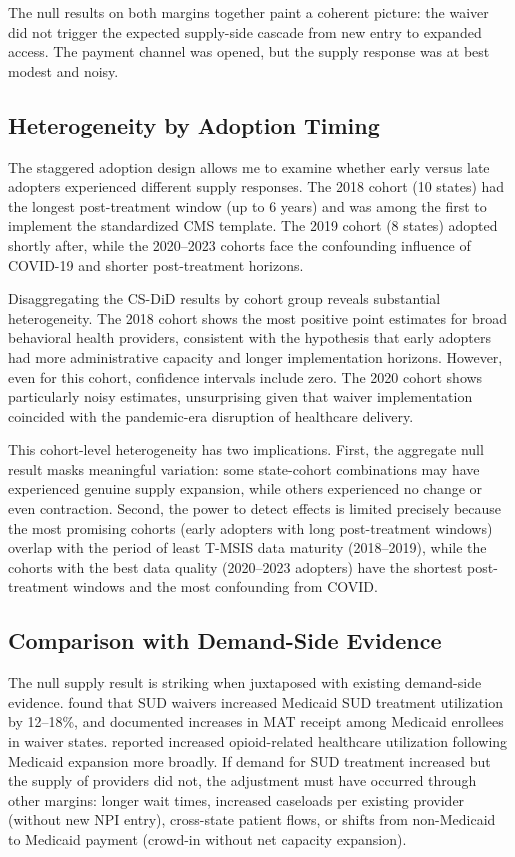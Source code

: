 \documentclass[12pt]{article}
\begin{document}
The null results on both margins together paint a coherent picture: the waiver did not trigger the expected supply-side cascade from new entry to expanded access. The payment channel was opened, but the supply response was at best modest and noisy.

\subsection{Heterogeneity by Adoption Timing}

The staggered adoption design allows me to examine whether early versus late adopters experienced different supply responses. The 2018 cohort (10 states) had the longest post-treatment window (up to 6 years) and was among the first to implement the standardized CMS template. The 2019 cohort (8 states) adopted shortly after, while the 2020--2023 cohorts face the confounding influence of COVID-19 and shorter post-treatment horizons.

Disaggregating the CS-DiD results by cohort group reveals substantial heterogeneity. The 2018 cohort shows the most positive point estimates for broad behavioral health providers, consistent with the hypothesis that early adopters had more administrative capacity and longer implementation horizons. However, even for this cohort, confidence intervals include zero. The 2020 cohort shows particularly noisy estimates, unsurprising given that waiver implementation coincided with the pandemic-era disruption of healthcare delivery.

This cohort-level heterogeneity has two implications. First, the aggregate null result masks meaningful variation: some state-cohort combinations may have experienced genuine supply expansion, while others experienced no change or even contraction. Second, the power to detect effects is limited precisely because the most promising cohorts (early adopters with long post-treatment windows) overlap with the period of least T-MSIS data maturity (2018--2019), while the cohorts with the best data quality (2020--2023 adopters) have the shortest post-treatment windows and the most confounding from COVID.

\subsection{Comparison with Demand-Side Evidence}

The null supply result is striking when juxtaposed with existing demand-side evidence. \citet{wen2022medicaid} found that SUD waivers increased Medicaid SUD treatment utilization by 12--18\%, and \citet{gertner2021association} documented increases in MAT receipt among Medicaid enrollees in waiver states. \citet{andrews2019impact} reported increased opioid-related healthcare utilization following Medicaid expansion more broadly. If demand for SUD treatment increased but the supply of providers did not, the adjustment must have occurred through other margins: longer wait times, increased caseloads per existing provider (without new NPI entry), cross-state patient flows, or shifts from non-Medicaid to Medicaid payment (crowd-in without net capacity expansion).
\end{document}

